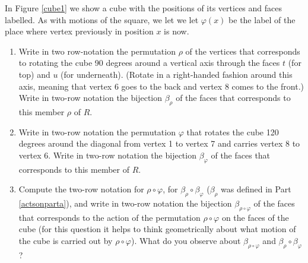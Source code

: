 \bp 
\iteme In Figure \ref{cube1} we show a cube with the positions of its
vertices and faces labelled.  As with motions of the square, we let we let 
$\varphi(x)$ be the label of the place where vertex  previously in
position
$x$ is now.
\begin{enumerate}
\item Write in two row-notation the permutation $\rho$ of the vertices
that corresponds to rotating the cube 90 degrees around a vertical axis
through the faces $t$ (for top) and $u$ (for underneath).  (Rotate in a
right-handed fashion around this axis, meaning that vertex 6 goes to the
back and vertex 8 comes to the front.)  Write in two-row notation the
bijection
$\beta_{\rho}$ of the faces that corresponds to this member $\rho$ of
$R$.\label{actsonparta}
\item Write in two-row notation the permutation $\varphi$ that rotates
the cube 120 degrees around the diagonal from vertex 1 to vertex 7 and
carries vertex 8 to vertex 6.  Write in two-row notation the bijection
$\beta_\varphi$ of the faces that corresponds to this member of $R$.
\item Compute the two-row notation for $\rho\circ\varphi$, for
$\beta_{\rho}\circ\beta_{\varphi}$ ($\beta_{\rho}$ was defined in Part
\ref{actsonparta}), and write in two-row notation the bijection 
$\beta_{\rho\circ\varphi}$ of the faces that corresponds to the action of
the permutation $\rho\circ\varphi$ on the faces of the cube (for this
question it helps to think geometrically about what motion of the cube is
carried out by $\rho\circ\varphi$).  What do you observe about
$\beta_{\rho\circ\varphi}$ and
$\beta_{\rho}\circ\beta_{\varphi}$?\label{cube2}
\end{enumerate}

